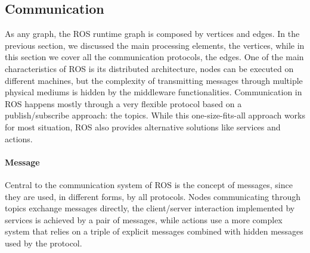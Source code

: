 \subsection{Communication}
As any graph, the ROS runtime graph is composed by vertices and edges. In the previous section, we discussed the main processing elements, the vertices, while in this section we cover all the communication protocols, the edges. One of the main characteristics of ROS is its distributed architecture, nodes can be executed on different machines, but the complexity of transmitting messages through multiple physical mediums is hidden by the middleware functionalities. Communication in ROS happens mostly through a very flexible protocol based on a publish/subscribe approach: the topics. While this one-size-fits-all approach works for most situation, ROS also provides alternative solutions like services and actions.

\paragraph{Message} Central to the communication system of ROS is the concept of messages, since they are used, in different forms, by all protocols. Nodes communicating through topics exchange messages directly, the client/server interaction implemented by services is achieved by a pair of messages, while actions use a more complex system that relies on a triple of explicit messages combined with hidden messages used by the protocol.

